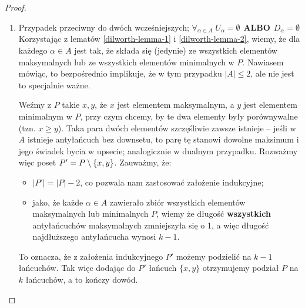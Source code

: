 \begin{proof}
\begin{enumerate}
		\item Przypadek przeciwny do dwóch wcześniejszych; \(\forall_{\alpha \in A } \; U_{\alpha} = \emptyset \hspace{5pt} \mathbf{ALBO} \hspace{5pt} D_{\alpha} = \emptyset\) \\

		      Korzystając z lematów \ref{dilworth-lemma-1} i \ref{dilworth-lemma-2}, wiemy, że dla każdego \(\alpha \in A\) jest tak, że składa się (jedynie) ze wszystkich elementów maksymalnych lub ze wszystkich elementów minimalnych w \(P\). Nawiasem mówiąc, to bezpośrednio implikuje, że w tym przypadku \( |A| \leq 2 \), ale nie jest to specjalnie ważne.

		      Weźmy z \(P\) takie \(x, y\), że \(x\) jest elementem maksymalnym, a \(y\) jest elementem minimalnym w \(P\), przy czym chcemy, by te dwa elementy były porównywalne (tzn. \( x \geq y\)). Taka para dwóch elementów szczęśliwie zawsze istnieje -- jeśli w \(A\) istnieje antyłańcuch bez downsetu, to parę tę stanowi dowolne maksimum i jego świadek bycia w upsecie; analogicznie w dualnym przypadku.  Rozważmy więc poset \(P' = P \setminus \set{x,y} \). Zauważmy, że:
		      \begin{itemize}
			      \item \( |P'| = |P| - 2\), co pozwala nam zastosować założenie indukcyjne;
			      \item jako, że każde \( \alpha \in A\) zawierało zbiór wszystkich elementów maksymalnych lub minimalnych \(P\), wiemy że długość \textbf{wszystkich} antyłańcuchów maksymalnych zmniejszyła się o 1, a więc długość najdłuższego antyłańcucha wynosi \(k-1\).
		      \end{itemize}
		      To oznacza, że z założenia indukcyjnego \( P' \) możemy podzielić na \(k-1\) łańcuchów. Tak więc dodając do \(P'\) łańcuch \( \{x, y\} \) otrzymujemy podział \(P\) na \(k\) łańcuchów, a to kończy dowód.

	\end{enumerate}
\end{proof} %
